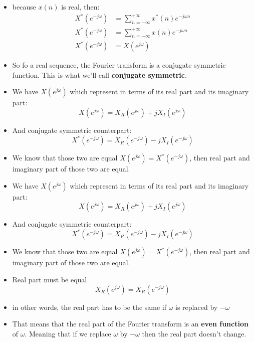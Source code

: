 \documentclass[pdflatex,compress,mathserif]{beamer}
\begin{document}
\begin{frame}
	\begin{itemize}
		\item[] because $ x(n) $ is real, then:
		\begin{align*}
		X^*(e^{-j\omega}) &= \sum_{n = -\infty}^{+\infty} x^*(n) e^{-j\omega n} \\
		X^*(e^{-j\omega}) &= \sum_{n = -\infty}^{+\infty} x(n) e^{-j\omega n} \\
		X^*(e^{-j\omega}) &= X(e^{j\omega})
		\end{align*}
		\item So fo a real sequence, the Fourier transform is a conjugate symmetric function. This is what we'll call \textbf{conjugate symmetric}.
	\end{itemize}
\end{frame}

\begin{frame}
	\begin{itemize}
		\item We have $ X(e^{j\omega}) $ which represent in terms of its real part and its imaginary part:
		\[ X(e^{j\omega}) = X_R(e^{j \omega}) + j X_I(e^{j \omega}) \]
		\item And conjugate symmetric counterpart:
		\[ X^*(e^{-j\omega}) = X_R(e^{-j \omega}) - j X_I(e^{-j \omega}) \]
		\item We know that those two are equal $ X(e^{j\omega}) = X^*(e^{-j\omega}) $, then real part and imaginary part of those two are equal.
	\end{itemize}
\end{frame}

\begin{frame}
	\begin{itemize}
		\item We have $ X(e^{j\omega}) $ which represent in terms of its real part and its imaginary part:
		\[ X(e^{j\omega}) = X_R(e^{j \omega}) + j X_I(e^{j \omega}) \]
		\item And conjugate symmetric counterpart:
		\[ X^*(e^{-j\omega}) = X_R(e^{-j \omega}) - j X_I(e^{-j \omega}) \]
		\item We know that those two are equal $ X(e^{j\omega}) = X^*(e^{-j\omega}) $, then real part and imaginary part of those two are equal.
	\end{itemize}
\end{frame}

\begin{frame}
	\begin{itemize}
		\item Real part must be equal
		\[ X_R(e^{j \omega}) = X_R(e^{-j \omega}) \]
		\item in other words, the real part has to be the same if $\omega$ is replaced by $-\omega$
		\item That means that the real part of the Fourier transform is an \textbf{even function} of $\omega$. Meaning that if we replace $\omega$ by $-\omega$ then the real part doesn't change.
	\end{itemize}
\end{frame}
\end{document}
